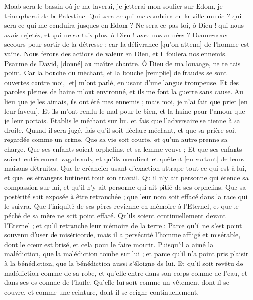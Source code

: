 \begin{multicols}{2}
Moab sera le bassin où je me laverai, je jetterai mon soulier sur Edom, je triompherai de la Palestine.
Qui sera-ce qui me conduira en la ville munie ? qui sera-ce qui me conduira jusques en Edom ?
Ne sera-ce pas toi, ô Dieu ! qui nous avais rejetés, et qui ne sortais plus, ô Dieu ! avec nos armées ?
Donne-nous secours pour sortir de la détresse ; car la délivrance [qu'on attend] de l'homme est vaine.
Nous ferons des actions de valeur en Dieu, et il foulera nos ennemis.
\VerseOne{}Psaume de David, [donné] au maître chantre. Ô Dieu de ma louange, ne te tais point.
Car la bouche du méchant, et la bouche [remplie] de fraudes se sont ouvertes contre moi, [et] m'ont parlé, en usant d'une langue trompeuse.
Et des paroles pleines de haine m'ont environné, et ils me font la guerre sans cause.
Au lieu que je les aimais, ils ont été mes ennemis ; mais moi, je n'ai fait que prier [en leur faveur].
Et ils m'ont rendu le mal pour le bien, et la haine pour l'amour que je leur portais.
Etablis le méchant sur lui, et fais que l'adversaire se tienne à sa droite.
Quand il sera jugé, fais qu'il soit déclaré méchant, et que sa prière soit regardée comme un crime.
Que sa vie soit courte, et qu'un autre prenne sa charge.
Que ses enfants soient orphelins, et sa femme veuve ;
Et que ses enfants soient entièrement vagabonds, et qu'ils mendient et quêtent [en sortant] de leurs maisons détruites.
Que le créancier usant d'exaction attrape tout ce qui est à lui, et que les étrangers butinent tout son travail.
Qu'il n'y ait personne qui étende sa compassion sur lui, et qu'il n'y ait personne qui ait pitié de ses orphelins.
Que sa postérité soit exposée à être retranchée ; que leur nom soit effacé dans la race qui le suivra.
Que l'iniquité de ses pères revienne en mémoire à l'Eternel, et que le péché de sa mère ne soit point effacé.
Qu'ils soient continuellement devant l'Eternel ; et qu'il retranche leur mémoire de la terre ;
Parce qu'il ne s'est point souvenu d'user de miséricorde, mais il a persécuté l'homme affligé et misérable, dont le cœur est brisé, et cela pour le faire mourir.
Puisqu'il a aimé la malédiction, que la malédiction tombe sur lui ; et parce qu'il n'a point pris plaisir à la bénédiction, que la bénédiction aussi s'éloigne de lui.
Et qu'il soit revêtu de malédiction comme de sa robe, et qu'elle entre dans son corps comme de l'eau, et dans ses os comme de l'huile.
Qu'elle lui soit comme un vêtement dont il se couvre, et comme une ceinture, dont il se ceigne continuellement.

\end{multicols}
